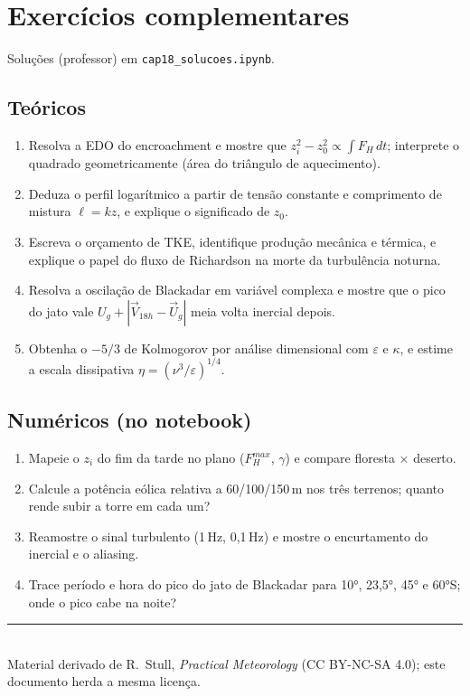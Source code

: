 \documentclass[11pt]{article}
\begin{document}
\section{Exercícios complementares}\label{sec:exercicios}

Soluções (professor) em \texttt{cap18\_solucoes.ipynb}.

\subsection*{Teóricos}

\begin{enumerate}[label=\textbf{T\arabic*.},itemsep=4pt]
  \item Resolva a EDO do encroachment e mostre que
        $z_i^2 - z_0^2 \propto \int F_H\,dt$; interprete o quadrado
        geometricamente (área do triângulo de aquecimento).
  \item Deduza o perfil logarítmico a partir de tensão constante e
        comprimento de mistura $\ell = kz$, e explique o significado
        de $z_0$.
  \item Escreva o orçamento de TKE, identifique produção mecânica e
        térmica, e explique o papel do fluxo de Richardson na morte da
        turbulência noturna.
  \item Resolva a oscilação de Blackadar em variável complexa e mostre
        que o pico do jato vale $U_g + |{\vec V}_{18h} - \vec U_g|$
        meia volta inercial depois.
  \item Obtenha o $-5/3$ de Kolmogorov por análise dimensional com
        $\varepsilon$ e $\kappa$, e estime a escala dissipativa
        $\eta = (\nu^3/\varepsilon)^{1/4}$.
\end{enumerate}

\subsection*{Numéricos (no notebook)}

\begin{enumerate}[label=\textbf{N\arabic*.},itemsep=4pt]
  \item Mapeie o $z_i$ do fim da tarde no plano
        ($F_H^{max}$, $\gamma$) e compare floresta × deserto.
  \item Calcule a potência eólica relativa a 60/100/150\,m nos três
        terrenos; quanto rende subir a torre em cada um?
  \item Reamostre o sinal turbulento (1\,Hz, 0{,}1\,Hz) e mostre o
        encurtamento do inercial e o aliasing.
  \item Trace período e hora do pico do jato de Blackadar para 10°,
        23{,}5°, 45° e 60°S; onde o pico cabe na noite?
\end{enumerate}

\vspace{1em}
\noindent\rule{\linewidth}{0.4pt}\\
{\scriptsize Material derivado de R.~Stull, \emph{Practical Meteorology}
(CC BY-NC-SA 4.0); este documento herda a mesma licença.}
\end{document}
